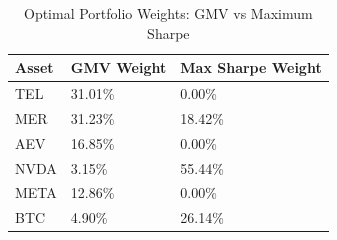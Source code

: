 \begin{table}[H]
\centering
\caption{\label{tab:optimal_weights}Optimal Portfolio Weights: GMV vs Maximum Sharpe}
\centering
\fontsize{9}{11}\selectfont
\begin{tabular}[t]{lll}
\toprule
Asset & GMV Weight & Max Sharpe Weight\\
\midrule
TEL & 31.01\% & 0.00\%\\
MER & 31.23\% & 18.42\%\\
AEV & 16.85\% & 0.00\%\\
NVDA & 3.15\% & 55.44\%\\
META & 12.86\% & 0.00\%\\
\addlinespace
BTC & 4.90\% & 26.14\%\\
\bottomrule
\end{tabular}
\end{table}
